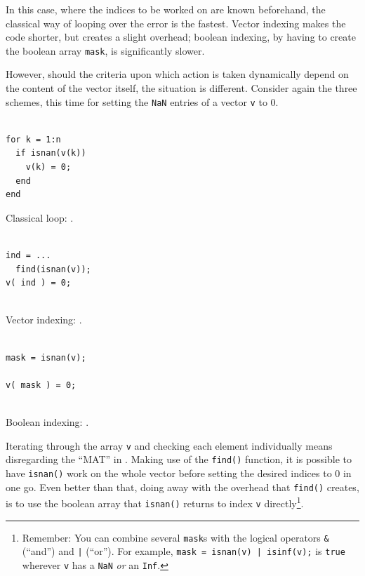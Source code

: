 In this case, where the indices to be worked on are known beforehand, the classical way of looping over the error is the fastest. Vector indexing makes the code shorter, but creates a slight overhead; boolean indexing, by having to create the boolean array \lstinline!mask!, is significantly slower.

However, should the criteria upon which action is taken dynamically depend on the content of the vector itself, the situation is different.
Consider again the three schemes, this time for setting the \lstinline!NaN! entries of a vector \lstinline!v! to $0$.

\hfill
\begin{minipage}[t]{.29\textwidth}
\begin{lstlisting}[framerule=1pt,rulecolor=\color{badred}]
% [...] create v

for k = 1:n
  if isnan(v(k))
    v(k) = 0;
  end
end
\end{lstlisting}
Classical loop: .
\end{minipage}
\hfill
\begin{minipage}[t]{.29\textwidth}
\begin{lstlisting}[framerule=1pt,rulecolor=\color{mediocre}]
% [...] create v

ind = ...
  find(isnan(v));
v( ind ) = 0;


\end{lstlisting}
Vector indexing: .
\end{minipage}
\hfill
\begin{minipage}[t]{.29\textwidth}
\begin{lstlisting}[framerule=1pt,rulecolor=\color{goodgreen}]
% [...] create v

mask = isnan(v);

v( mask ) = 0;


\end{lstlisting}
Boolean indexing: .
\end{minipage}
\hfill

Iterating through the array \lstinline!v! and checking each element individually means disregarding the ``MAT'' in \matlab{}. Making use of the \lstinline!find()! function, it is possible to have \lstinline!isnan()! work on the whole vector before setting the desired indices to 0 in one go. Even better than that, doing away with the overhead that \lstinline!find()! creates, is to use the boolean array that \lstinline!isnan()! returns to index \lstinline!v! directly\footnote{Remember: You can combine several \lstinline!mask!s with the logical operators \lstinline!&! (``and'') and \lstinline!|! (``or''). For example, \lstinline!mask = isnan(v) | isinf(v);! is \lstinline!true! wherever \lstinline!v! has a \lstinline!NaN! \emph{or} an \lstinline!Inf!.}.


